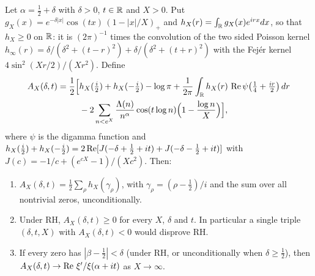\begin{proposition}\label{mw:prop:AX}
Let $\alpha=\tfrac12+\delta$ with $\delta>0$, $t\in\mathbb{R}$ and $X>0$. Put $g_X(x)=e^{-\delta|x|}\cos(tx)\,(1-|x|/X)_+$ and $h_X(r)=\int_{\mathbb{R}} g_X(x)e^{irx}dx$, so that $h_X\geq0$ on $\mathbb{R}$: it is $(2\pi)^{-1}$ times the convolution of the two sided Poisson kernel $h_\infty(r)=\delta/(\delta^2+(t-r)^2)+\delta/(\delta^2+(t+r)^2)$ with the Fej\'er kernel $4\sin^2(Xr/2)/(Xr^2)$. Define
\[
\begin{aligned}
A_X(\delta,t)=\frac12\Bigl[&h_X(\tfrac i2)+h_X(-\tfrac i2)-\log\pi+\frac1{2\pi}\int_{\mathbb{R}} h_X(r)\,\operatorname{Re}\psi\bigl(\tfrac14+\tfrac{ir}2\bigr)\,dr\\
&-2\sum_{n<e^X}\frac{\Lambda(n)}{n^{\alpha}}\cos(t\log n)\Bigl(1-\frac{\log n}X\Bigr)\Bigr],
\end{aligned}
\]
where $\psi$ is the digamma function and $h_X(\tfrac i2)+h_X(-\tfrac i2)=2\operatorname{Re}[J(-\delta+\tfrac12+it)+J(-\delta-\tfrac12+it)]$ with $J(c)=-1/c+(e^{cX}-1)/(Xc^2)$. Then:
\begin{enumerate}
\item[(a)] $A_X(\delta,t)=\frac12\sum_\rho h_X(\gamma_\rho)$, with $\gamma_\rho=(\rho-\tfrac12)/i$ and the sum over all nontrivial zeros, unconditionally.
\item[(b)] Under RH, $A_X(\delta,t)\geq0$ for every $X$, $\delta$ and $t$. In particular a single triple $(\delta,t,X)$ with $A_X(\delta,t)<0$ would disprove RH.
\item[(c)] If every zero has $|\beta-\tfrac12|<\delta$ (under RH, or unconditionally when $\delta\geq\tfrac12$), then $A_X(\delta,t)\to\operatorname{Re}\,\xi'/\xi(\alpha+it)$ as $X\to\infty$.
\end{enumerate}
\end{proposition}

